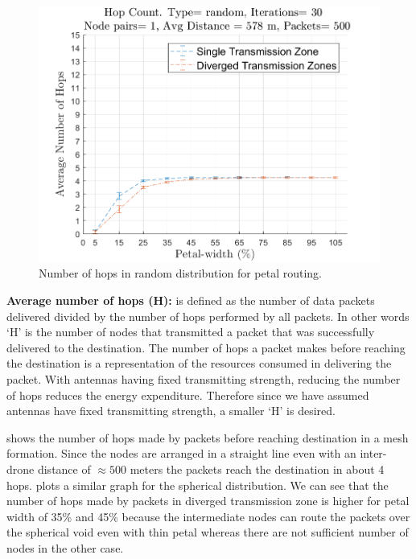 \begin{figure}[hbtp]
\centering
\includegraphics[width=\simResultFigSize\textwidth,height=\textheight,keepaspectratio]{ncsuthesis-0.6/Chapter-5/figs/pe_hops_random.png}
\caption{Number of hops in random distribution for petal routing.}
\label{fig:pe_hops_random}
\end{figure}

\textbf{Average number of hops (H):} is defined as the number of data packets delivered divided by the number of hops performed by all packets. In other words `H' is the number of nodes that transmitted a packet that was successfully delivered to the destination. The number of hops a packet makes before reaching the destination is a representation of the resources consumed in delivering the packet. With antennas having fixed transmitting strength, reducing the number of hops reduces the energy expenditure. Therefore since we have assumed antennas have fixed transmitting strength, a smaller `H' is desired.

 shows the number of hops made by packets before reaching destination in a mesh formation. Since the nodes are arranged in a straight line even with an inter-drone distance of $\approx 500$ meters the packets reach the destination in about 4 hops.  plots a similar graph for the spherical distribution. We can see that the number of hops made by packets in  diverged transmission zone is higher for petal width of 35\% and 45\% because the intermediate nodes can route the packets over the spherical void even with thin petal whereas there are not sufficient number of nodes in the other case.

